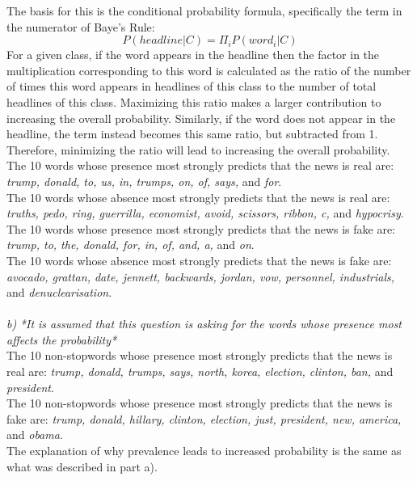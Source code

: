 \documentclass{article}
\begin{document}
The basis for this is the conditional probability formula, specifically the term in the numerator of Baye's Rule:
$$P(headline|C)=\Pi_{i}P(word_i|C)$$
For a given class, if the word appears in the headline then the factor in the multiplication corresponding to this word is calculated as the ratio of the number of times this word appears in headlines of this class to the number of total headlines of this class. Maximizing this ratio makes a larger contribution to increasing the overall probability. Similarly, if the word does not appear in the headline, the term instead becomes this same ratio, but subtracted from 1. Therefore, minimizing the ratio will lead to increasing the overall probability.\\

The 10 words whose presence most strongly predicts that the news is real are: \textit{trump, donald, to, us, in, trumps, on, of, says,} and \textit{for}.\\

The 10 words whose absence most strongly predicts that the news is real are: \textit{truths, pedo, ring, guerrilla, economist, avoid, scissors, ribbon, c,} and \textit{hypocrisy}.\\

The 10 words whose presence most strongly predicts that the news is fake are: \textit{trump, to, the, donald, for, in, of, and, a,} and \textit{on}.\\

The 10 words whose absence most strongly predicts that the news is fake are: \textit{avocado, grattan, date, jennett, backwards, jordan, vow, personnel, industrials,} and \textit{denuclearisation}.\\\\
\textit{b)} \textit{*It is assumed that this question is asking for the words whose presence most affects the probability*}\\
The 10 non-stopwords whose presence most strongly predicts that the news is real are: \textit{trump, donald, trumps, says, north, korea, election, clinton, ban,} and \textit{president}.\\
The 10 non-stopwords whose presence most strongly predicts that the news is fake are: \textit{trump, donald, hillary, clinton, election, just, president, new, america,} and \textit{obama}.\\

The explanation of why prevalence leads to increased probability is the same as what was described in part a).\\
\end{document}

